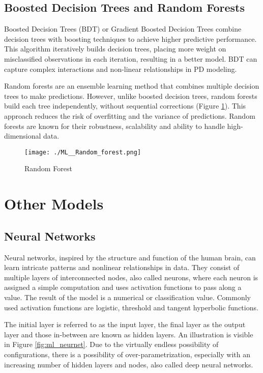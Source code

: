\subsection{Boosted Decision Trees and Random Forests} 
Boosted Decision Trees (BDT) or Gradient Boosted Decision Trees combine decision trees with boosting techniques to achieve higher predictive performance. This algorithm iteratively builds decision trees, placing more weight on misclassified observations in each iteration, resulting in a better model. BDT can capture complex interactions and non-linear relationships in PD modeling. 

Random forests are an ensemble learning method that combines multiple decision trees to make predictions. However, unlike boosted decision trees, random forests build each tree independently, without sequential corrections (Figure \ref{fig:ml_ranforest}). This approach reduces the risk of overfitting and the variance of predictions. Random forests are known for their robustness, scalability and ability to handle high-dimensional data. \cite[p.~88]{Witzany:2017}

\begin{figure}[H]
	\centering
	\texttt{[image: ./ML\_\_Random\_forest.png]}
    \caption{Random Forest}
    \label{fig:ml_ranforest}
\end{figure}

\section{Other Models}

\subsection{Neural Networks}
Neural networks, inspired by the structure and function of the human brain, can learn intricate patterns and nonlinear relationships in data. They consist of multiple layers of interconnected nodes, also called neurons, where each neuron is assigned a simple computation and uses activation functions to pass along a value. The result of the model is a numerical or classification value. Commonly used activation functions are logistic, threshold and tangent hyperbolic functions.

The initial layer is referred to as the input layer, the final layer as the output layer and those in-between are known as hidden layers. An illustration is visible in Figure \ref{fig:ml_neurnet}. Due to the virtually endless possibility of configurations, there is a possibility of over-parametrization, especially with an increasing number of hidden layers and nodes, also called deep neural networks. \cite[pp.~79-80]{Witzany:2017}

